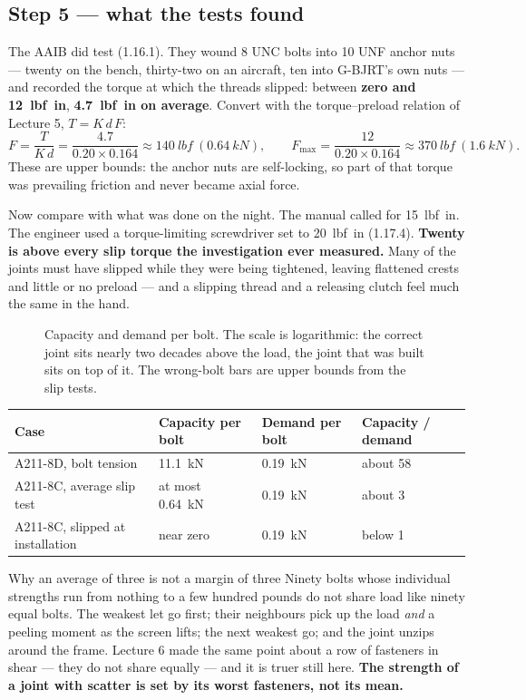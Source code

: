 \documentclass[11pt,a4paper]{article}
\begin{document}
\subsection*{Step 5 --- what the tests found}
The AAIB did test (1.16.1). They wound 8 UNC bolts into 10 UNF anchor nuts --- twenty on the
bench, thirty-two on an aircraft, ten into G-BJRT's own nuts --- and recorded the torque at which
the threads slipped: between \textbf{zero and \SI{12}{lbf.in}}, \textbf{\SI{4.7}{lbf.in} on
average}. Convert with the torque--preload relation of Lecture 5, $T=K\,d\,F$:
\[
F=\frac{T}{K\,d}=\frac{4.7}{0.20\times0.164}\approx\SI{140}{lbf}\ (\SI{0.64}{kN}),\qquad
F_{\max}=\frac{12}{0.20\times0.164}\approx\SI{370}{lbf}\ (\SI{1.6}{kN}).
\]
These are upper bounds: the anchor nuts are self-locking, so part of that torque was prevailing
friction and never became axial force.

\medskip
Now compare with what was done on the night. The manual called for \SI{15}{lbf.in}. The engineer
used a torque-limiting screwdriver set to \SI{20}{lbf.in} (1.17.4). \textbf{Twenty is above every
slip torque the investigation ever measured.} Many of the joints must have slipped while they were
being tightened, leaving flattened crests and little or no preload --- and a slipping thread and a
releasing clutch feel much the same in the hand.

\begin{figure}[H]\centering

\caption{Capacity and demand per bolt. The scale is logarithmic: the correct joint sits nearly two
decades above the load, the joint that was built sits on top of it. The wrong-bolt bars are upper
bounds from the slip tests.}
\label{fig:margin}
\end{figure}

\begin{center}\small
\begin{tabular}{@{}llll@{}}
\toprule
Case & Capacity per bolt & Demand per bolt & Capacity / demand\\
\midrule
A211-8D, bolt tension & \SI{11.1}{kN} & \SI{0.19}{kN} & about 58\\
A211-8C, average slip test & at most \SI{0.64}{kN} & \SI{0.19}{kN} & about 3\\
A211-8C, slipped at installation & near zero & \SI{0.19}{kN} & below 1\\
\bottomrule
\end{tabular}
\end{center}

\begin{keybox}{Why an average of three is not a margin of three}
Ninety bolts whose individual strengths run from nothing to a few hundred pounds do not share load
like ninety equal bolts. The weakest let go first; their neighbours pick up the load \emph{and} a
peeling moment as the screen lifts; the next weakest go; and the joint unzips around the frame.
Lecture 6 made the same point about a row of fasteners in shear --- they do not share equally ---
and it is truer still here. \textbf{The strength of a joint with scatter is set by its worst
fasteners, not its mean.}
\end{keybox}
\end{document}
